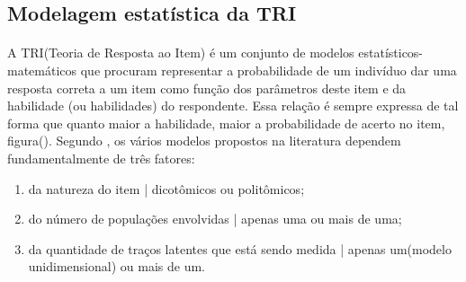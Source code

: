 	\subsection{Modelagem estatística da TRI}
	\paragraph{}
    	A TRI(Teoria de Resposta ao Item) é um conjunto de modelos estatísticos-matemáticos que procuram representar a probabilidade de um indivíduo dar uma resposta correta a um item como função dos parâmetros deste item e da habilidade (ou habilidades) do respondente. Essa relação é sempre expressa de tal forma que quanto maior a habilidade, maior a probabilidade de acerto no item, figura(). Segundo \textcite{Dalton}, os vários modelos propostos na literatura dependem fundamentalmente de três fatores:\\
    	\begin{enumerate}
    	    \item da natureza do item | dicotômicos ou politômicos;
    	    \item do número de populações envolvidas | apenas uma ou mais de uma;
    	    \item da quantidade de traços latentes que está sendo medida | apenas um(modelo unidimensional) ou mais de um.
    	\end{enumerate}
